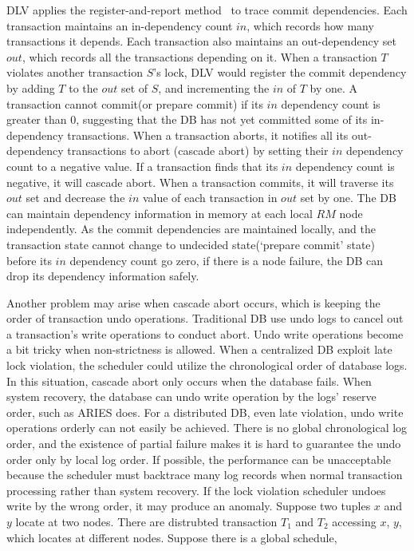 \documentclass[conference]{IEEEtran}
\begin{document}
DLV applies the register-and-report method~\cite{HeckatonMVCC:journals/pvldb/LarsonBDFPZ11} to trace commit dependencies.
Each transaction maintains an in-dependency count ${in}$, which records how many transactions it depends.
Each transaction also maintains an out-dependency set  ${out}$, which records all the transactions depending on it.
When a transaction ${T}$ violates another transaction ${S}$'s lock,
DLV would register the commit dependency by adding ${T}$ to the ${out}$ set of ${S}$, and incrementing the ${in}$ of ${T}$ by one.
A transaction cannot commit(or prepare commit) if its ${in}$ dependency count is greater than 0, suggesting that the DB has not yet committed some of its in-dependency transactions.
When a transaction aborts, it notifies all its out-dependency transactions to abort (cascade abort) by setting their ${in}$ dependency count to a negative value.
If a transaction finds that its ${in}$ dependency count is negative, it will cascade abort.
When a transaction commits, it will traverse its ${out}$ set and decrease the ${in}$ value of each transaction in ${out}$ set by one.
The DB can maintain dependency information in memory at each local $RM$ node independently.
As the commit dependencies are maintained locally, and the transaction state cannot change to undecided state(`prepare commit' state) before its ${in}$ dependency count go zero,
if there is a node failure,  the DB can drop its dependency information safely. 

Another problem may arise when cascade abort occurs,
which is keeping the order of transaction undo operations. 
Traditional DB use undo logs to cancel out a transaction's write operations to conduct abort.
Undo write operations become a bit tricky when non-strictness is allowed.
When a centralized DB exploit late lock violation, the scheduler could utilize the chronological order of database logs.
In this situation, cascade abort only occurs when the database fails.
When system recovery, the database can undo write operation by the logs' reserve order, such as ARIES \cite{ARIES:journals/tods/MohanHLPS92} does.
For a distributed DB, even late violation, undo write operations orderly can not easily be achieved.
There is no global chronological log order, and the existence of partial failure makes it is hard to guarantee the undo order only by local log order.
If possible, the performance can be unacceptable because the scheduler must backtrace many log records when normal transaction processing rather than system recovery.
If the lock violation scheduler undoes write by the wrong order, it may produce an anomaly.
Suppose two tuples $x$ and $y$ locate at two nodes.
There are distrubted transaction $T_1$ and $T_2$ accessing $x$, $y$, which locates at different nodes.
Suppose there is a global schedule,
\end{document}
